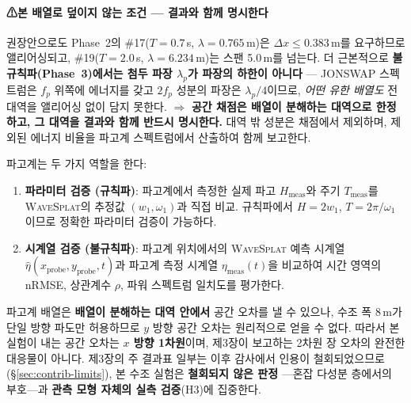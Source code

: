 \documentclass[11pt]{report}
\numberwithin{equation}{chapter}
\numberwithin{figure}{chapter}
\numberwithin{table}{chapter}
\newcommand{\WS}{\textsc{WaveSplat}}
\begin{document}
\paragraph{⚠본 배열로 덮이지 않는 조건 --- 결과와 함께 명시한다}
권장안으로도 Phase~2의 \#17($T = 0.7$\,s, $\lambda = 0.765$\,m)은
$\Delta x \le 0.383$\,m를 요구하므로 앨리어싱되고,
\#19($T = 2.0$\,s, $\lambda = 6.234$\,m)는 스팬 5.0\,m를 넘는다.
더 근본적으로 \textbf{불규칙파(Phase~3)에서는 첨두 파장 $\lambda_p$가 파장의 하한이 아니다}
--- JONSWAP 스펙트럼은 $f_p$ 위쪽에 에너지를 갖고 $2f_p$ 성분의 파장은 $\lambda_p/4$이므로,
\emph{어떤 유한 배열도} 전 대역을 앨리어싱 없이 담지 못한다.
$\Rightarrow$ \textbf{공간 채점은 배열이 분해하는 대역으로 한정하고,
그 대역을 결과와 함께 반드시 명시한다.} 대역 밖 성분은 채점에서 제외하며,
제외된 에너지 비율을 파고계 스펙트럼에서 산출하여 함께 보고한다.

파고계는 두 가지 역할을 한다:
\begin{enumerate}
  \item \textbf{파라미터 검증 (규칙파)}:
        파고계에서 측정한 실제 파고 $H_{\text{meas}}$와 주기 $T_{\text{meas}}$를
        \WS{}의 추정값 $(w_1, \omega_1)$과 직접 비교.
        규칙파에서 $H = 2w_1$, $T = 2\pi/\omega_1$이므로 정확한 파라미터 검증이 가능하다.
  \item \textbf{시계열 검증 (불규칙파)}:
        파고계 위치에서의 \WS{} 예측 시계열
        $\hat{\eta}(x_{\text{probe}}, y_{\text{probe}}, t)$과
        파고계 측정 시계열 $\eta_{\text{meas}}(t)$을 비교하여
        시간 영역의 nRMSE, 상관계수 $\rho$, 파워 스펙트럼 일치도를 평가한다.
\end{enumerate}

파고계 배열은 \textbf{배열이 분해하는 대역 안에서} 공간 오차를 낼 수 있으나,
수조 폭 8\,m가 단일 방향 파도만 허용하므로 $y$ 방향 공간 오차는 원리적으로 얻을 수 없다.
따라서 본 실험이 내는 공간 오차는 \textbf{$x$ 방향 1차원}이며,
제3장이 보고하는 2차원 장 오차의 완전한 대응물이 아니다.
제3장의 주 결과표 일부는 이후 감사에서 인용이 철회되었으므로
(\S\ref{sec:contrib-limits}), 본 수조 실험은 \textbf{철회되지 않은 판정}
---혼잡 다성분 층에서의 부호---과 \textbf{관측 모형 자체의 실측 검증}(H3)에 집중한다.
\end{document}
